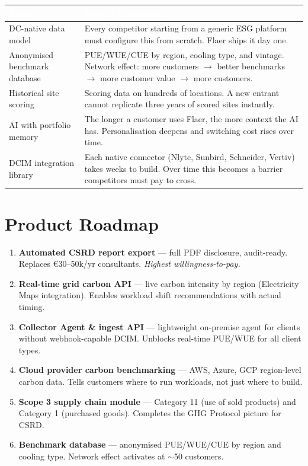 \documentclass[11pt, a4paper]{article}
\newcommand{\tableheader}[1]{\cellcolor{flaergreen!90}\textcolor{white}{\textbf{\small #1}}}
\begin{document}
\begin{tabular}{p{3.5cm} p{12cm}}
  \toprule
  \tableheader{Asset} & \tableheader{Why It Compounds} \\
  \midrule
  DC-native data model & Every competitor starting from a generic ESG platform must configure this from scratch. Flaer ships it day one. \\
  \rowcolor{rowalt}
  Anonymised benchmark database & PUE/WUE/CUE by region, cooling type, and vintage. Network effect: more customers $\rightarrow$ better benchmarks $\rightarrow$ more customer value $\rightarrow$ more customers. \\
  Historical site scoring & Scoring data on hundreds of locations. A new entrant cannot replicate three years of scored sites instantly. \\
  \rowcolor{rowalt}
  AI with portfolio memory & The longer a customer uses Flaer, the more context the AI has. Personalisation deepens and switching cost rises over time. \\
  DCIM integration library & Each native connector (Nlyte, Sunbird, Schneider, Vertiv) takes weeks to build. Over time this becomes a barrier competitors must pay to cross. \\
  \bottomrule
\end{tabular}

\section{Product Roadmap}

\begin{tcolorbox}[flaerbox, title=Priority roadmap — next 12 months]
\begin{enumerate}[leftmargin=1.6em, itemsep=4pt]
  \item \textbf{Automated CSRD report export} — full PDF disclosure, audit-ready. Replaces €30--50k/yr consultants. \textit{Highest willingness-to-pay.}
  \item \textbf{Real-time grid carbon API} — live carbon intensity by region (Electricity Maps integration). Enables workload shift recommendations with actual timing.
  \item \textbf{Collector Agent \& ingest API} — lightweight on-premise agent for clients without webhook-capable DCIM. Unblocks real-time PUE/WUE for all client types.
  \item \textbf{Cloud provider carbon benchmarking} — AWS, Azure, GCP region-level carbon data. Tells customers where to run workloads, not just where to build.
  \item \textbf{Scope 3 supply chain module} — Category 11 (use of sold products) and Category 1 (purchased goods). Completes the GHG Protocol picture for CSRD.
  \item \textbf{Benchmark database} — anonymised PUE/WUE/CUE by region and cooling type. Network effect activates at $\sim$50 customers.
\end{enumerate}
\end{tcolorbox}
\end{document}
